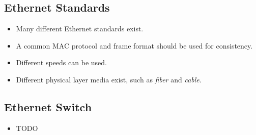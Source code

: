 \documentclass{article}
\begin{document}
\subsection{Ethernet Standards}

\begin{itemize}
\item Many different Ethernet standards exist.
\item A common MAC protocol and frame format should be used for consistency.
\item Different speeds can be used.
\item Different physical layer media exist, such as \emph{fiber} and \emph{cable}.
\end{itemize}

\subsection{Ethernet Switch}

\begin{itemize}
\item TODO
\end{itemize}
\end{document}
